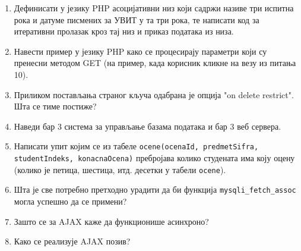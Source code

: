 \documentclass[a4paper]{slides}
\begin{document}
\begin{enumerate}
\hrulefill

\hrulefill

\hrulefill

\item Дефинисати у језику PHP асоцијативни низ који садржи називе три испитна рока и
датуме писмених за УВИТ у та три рока, те написати код за
итеративни пролазак кроз тај низ и приказ података из низа.

\hrulefill

\hrulefill

\hrulefill

\hrulefill


\item Навести пример у језику PHP како се процесирају параметри који су пренесни методом GET (на пример, када корисник кликне на везу из питања 10). \hrulefill

\hrulefill

\hrulefill

\item Приликом постављања страног кључа одабрана је опција "on delete restrict". Шта се тиме постиже? \hrulefill

\hrulefill

\hrulefill



\item Наведи бар 3 система за управљање базама података и бар 3 веб сервера. \hrulefill

\hrulefill


\item Написати упит којим се из табеле \verb|ocene(ocenaId, predmetSifra, studentIndeks, konacnaOcena)| 
пребројава колико студената има коју оцену (колико је петица, шестица, итд. десетки у табели \verb|ocene|).

\hrulefill

\hrulefill

\hrulefill

\item Шта је све потребно претходно урадити да би функција \verb|mysqli_fetch_assoc| могла успешно да се примени?\hrulefill

\hrulefill

\hrulefill


\item Зашто се за AJAX каже да функционише асинхроно? \hrulefill 

\hrulefill

\hrulefill

\item Како се реализује AJAX позив? \hrulefill

\hrulefill

\hrulefill

\end{enumerate}
\end{document}
